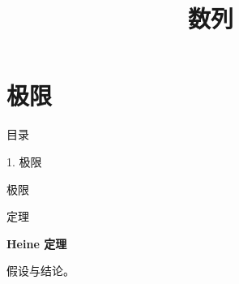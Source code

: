 \documentclass[aspectratio=169,10pt,fontset=fandol]{ctexbeamer}
\title{数列}
\begin{document}
\section{极限}
\begin{frame}[t,fragile]{目录}
\normalsize
{\color{blue}\normalsize 1. 极限\par}\vspace{0.22em}
\end{frame}
\begin{frame}[t,fragile]{极限}
\normalsize
\begin{block}{定理}
{\normalsize
\textbf{Heine 定理}\par
假设与结论。
}
\end{block}
\end{frame}
\end{document}
